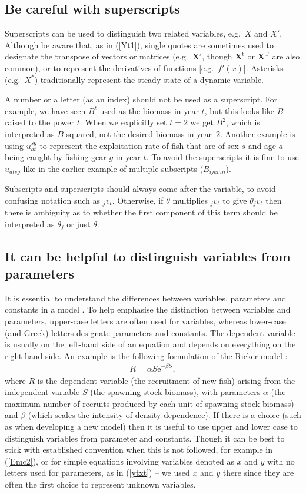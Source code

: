 \documentclass[12pt]{article}
\newcommand{\eb}{\begin{eqnarray}}
\newcommand{\ee}{\end{eqnarray}}
\begin{document}
\subsection*{Be careful with superscripts}

Superscripts can be used to distinguish two related variables, e.g.~$X$ and $X'$.
Although be aware that, as in (\ref{Yt1}), single quotes are sometimes used to designate the
transpose of vectors or matrices (e.g.~$\mathbf{X}'$, though $\mathbf{X}^{\mbox{t}}$ or 
$\mathbf{X}^{\mbox{T}}$ are also common), 
or to represent the derivatives of functions [e.g.~$f'(x)$].
Asterisks (e.g.~$X^*$) traditionally represent the steady state of a dynamic
variable. 

A number or a letter (as an index) should not be used 
as a superscript. For example, we have seen $B^t$ used as
the biomass in year $t$, but this looks like $B$ raised to the power $t$.
When we explicitly set $t=2$ we get $B^2$, which is interpreted as $B$ 
squared, not the desired biomass in year~2.
Another example is using $u_{at}^{sg}$ to represent the exploitation rate
of fish that are of sex $s$ and age $a$ being caught by fishing gear $g$ in 
year $t$. To avoid the superscripts it is fine to use $u_{atsg}$ like in the
earlier example of multiple subscripts ($B_{ijkmn}$).

Subscripts and superscripts should always come after the variable, to avoid
confusing notation such as $_jv_t$. Otherwise, if $\theta$ multiplies $_jv_t$
to give $\theta_jv_t$ then there is ambiguity as to whether
the first component of this term should be interpreted as $\theta_j$ or just
$\theta$.

\subsection*{It can be helpful to distinguish variables from parameters}

It is essential to understand the differences between variables, parameters and
constants in a model \citep{ps93}. To help emphasise the distinction between
variables and parameters, 
upper-case letters are often used for variables, whereas lower-case (and Greek)
letters designate parameters and constants. The dependent variable is usually on
the 
left-hand side of an equation and depends on everything on the right-hand side.
An example is the following formulation of the Ricker model \citep{bjorks12}:
\eb
R = \alpha S \mbox{e}^{-\beta S},
\label{ricker}
\ee
where $R$ is the dependent variable (the recruitment of new fish) arising from
the independent variable $S$ (the spawning stock biomass), with parameters
 $\alpha$ (the maximum number of recruits produced by each unit
of spawning stock biomass) and $\beta$ (which scales the intensity of density
dependence). If there is a choice (such as when
developing a new model) then it is useful to use upper and lower case to
distinguish variables from parameter and constants.
Though it can be best
to stick with established convention when this is not followed, for example in
(\ref{Emc2}), or for simple equations involving variables denoted as $x$ and $y$
with no letters used for parameters, as in (\ref{ytxt}) -- we used $x$ and $y$
there since they are often the first choice to represent unknown variables.
\end{document}
